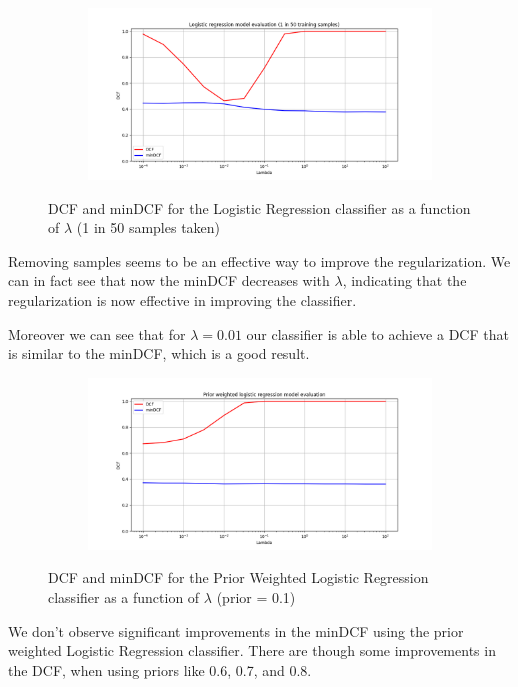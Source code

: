 \documentclass[12pt]{report}
\newcommand{\nl}{%
    \newline
    \noindent
}
\begin{document}
\begin{figure}[H]
    \centering
    \begin{subfigure}[t]{0.6\textwidth}
        \includegraphics[width=\textwidth]{./plot/LR/log_reg_1in50.png}
    \end{subfigure}
    \caption{DCF and minDCF for the Logistic Regression classifier as a function of $\lambda$ (1 in 50 samples taken)}
    \label{fig:log_reg_1in50}
\end{figure}
\noindent
Removing samples seems to be an effective way to improve the regularization. We can in fact see that now the minDCF decreases with $\lambda$, indicating that the regularization is now effective in improving the classifier.
\nl
Moreover we can see that for $\lambda = 0.01$ our classifier is able to achieve a DCF that is similar to the minDCF, which is a good result.

\begin{figure}[H]
    \centering
    \begin{subfigure}[t]{0.6\textwidth}
        \includegraphics[width=\textwidth]{./plot/LR/prior_w_log_reg.png}
    \end{subfigure}
    \caption{DCF and minDCF for the Prior Weighted Logistic Regression classifier as a function of $\lambda$ (prior = 0.1)}
    \label{fig:pw_log_reg}
\end{figure}
\noindent
We don't observe significant improvements in the minDCF using the prior weighted Logistic Regression classifier. There are though some improvements in the DCF, when using priors like 0.6, 0.7, and 0.8.
\end{document}
